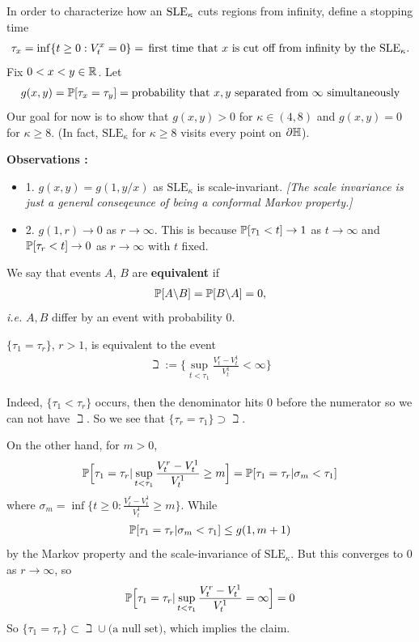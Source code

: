 \documentclass[12pt,a4paper]{article}
\newenvironment{proof}
{\begin{changemargin}{0.5cm}{0.5cm} 
	}%
	{\end{changemargin}
}
\renewenvironment{i}
{\begin{itemize} 
	}%
	{\end{itemize}
}
\newenvironment{p}
{\begin{proof} 
	}%
	{\end{proof}
}
\begin{document}
In order to characterize how an $\text{SLE}_{\kappa}$ cuts regions from infinity, define a stopping time
\begin{align*}
\tau_{x} = \inf \{t\geq 0 : V_t^x =0 \} = \, \text{first time that }x\text{ is cut off from infinity by the } \text{SLE}_{\kappa}.
\end{align*}
Fix $0<x<y \in \mathbb{R}$. Let 
\begin{align*}
g(x,y) = \mathbb{P} [\tau_x = \tau_y] = \text{probability that } x,y\text{ separated from } \infty \text{ simultaneously}
\end{align*}
Our goal for now is to show that $g(x,y) >0$ for $\kappa \in (4,8)$ and $g(x,y) = 0$ for $\kappa \geq 8$. (In fact, $\text{SLE}_{\kappa}$ for $\kappa \geq 8$ visits every point on $\partial \mathbb{H}$).
\s

\textbf{Observations :}
\begin{i}
\item[1.] $g(x,y) = g(1, y/x)$ as $\text{SLE}_{\kappa}$ is scale-invariant. \emph{[The scale invariance is just a general conseqeunce of being a conformal Markov property.]} 
\item[2.] $g(1,r) \rightarrow 0$ as $r\rightarrow \infty$. This is because $\mathbb{P}[\tau_1 < t] \rightarrow 1$ as $t\rightarrow \infty$ and $\mathbb{P} [\tau_r < t] \rightarrow 0$ as $r\rightarrow \infty$ with $t$ fixed. 
\end{i}
\s

 We say that events $A$, $B$ are \textbf{equivalent} if 
\begin{align*}
\mathbb{P} [A \backslash B] = \mathbb{P}[B \backslash A] =0,
\end{align*}
\textit{i.e.} $A, B$ differ by an event with probability 0.
\s

\prop $\{ \tau_1 = \tau_r \}$, $r>1$, is equivalent to the event
\begin{align*}
\beth := \big\{ \sup_{t< \tau_1} \frac{V_t^r - V_t^1}{V_t^1} < \infty \big\}
\end{align*}
\begin{p}
\pf Indeed, $\{ \tau_1 < \tau_r \}$ occurs, then the denominator hits 0 before the numerator so we can not have $\beth$. So we see that $\{ \tau_r = \tau_1 \} \supset \beth$.

\quad On the other hand, for $m>0$,
\begin{align*}
\mathbb{P} \Big[ \tau_1 = \tau_r | \sup_{t <\tau_1} \frac{V_t^r - V_t^1}{V_t^1} \geq m \Big] = \mathbb{P} [\tau_1 = \tau_r | \sigma_m < \tau_1 ]
\end{align*}
where $\sigma_m = \inf \{t\geq 0 : \frac{V_t^r - V_t^1}{V_t^1} \geq m \}$. While
\begin{align*}
\mathbb{P} [\tau_1 = \tau_r | \sigma_m < \tau_1 ] \leq g(1, m+1)
\end{align*}
by the Markov property and the scale-invariance of $\text{SLE}_{\kappa}$. But this converges to 0 as $r\rightarrow \infty$, so
\begin{align*}
\mathbb{P} \Big[ \tau_1 = \tau_r | \sup_{t< \tau_1} \frac{V_t^r - V_t^1}{V_t^1} = \infty \Big]= 0
\end{align*}
So $\{ \tau_1 = \tau_r \} \subset \beth \cup \text{(a null set)}$, which implies the claim.

\eop
\end{p}
\s
\end{document}
